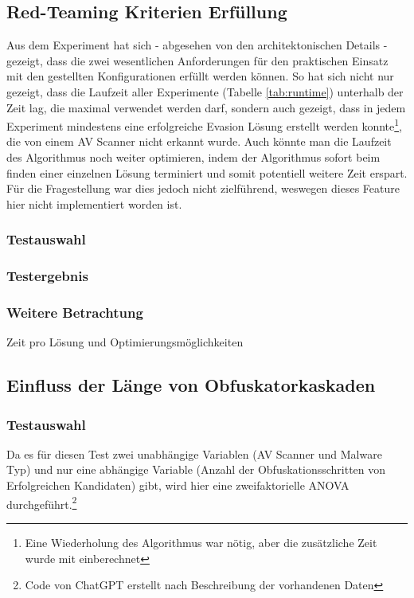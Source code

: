 \subsection{Red-Teaming Kriterien Erfüllung}
Aus dem Experiment hat sich - abgesehen von den architektonischen Details - gezeigt, dass die zwei wesentlichen Anforderungen für den praktischen Einsatz mit den gestellten Konfigurationen erfüllt werden können.
So hat sich nicht nur gezeigt, dass die Laufzeit aller Experimente (Tabelle \ref{tab:runtime}) unterhalb der Zeit lag, die maximal verwendet werden darf, sondern auch gezeigt, dass in jedem Experiment mindestens eine erfolgreiche Evasion Lösung erstellt werden konnte\footnote{Eine Wiederholung des Algorithmus war nötig, aber die zusätzliche Zeit wurde mit einberechnet}, die von einem AV Scanner nicht erkannt wurde. Auch könnte man die Laufzeit des Algorithmus noch weiter optimieren, indem der Algorithmus sofort beim finden einer einzelnen Lösung terminiert und somit potentiell weitere Zeit erspart. Für die Fragestellung war dies jedoch nicht zielführend, weswegen dieses Feature hier nicht implementiert worden ist.

\subsubsection{Testauswahl}
\subsubsection{Testergebnis}
\subsubsection{Weitere Betrachtung}
Zeit pro Lösung und Optimierungsmöglichkeiten


\subsection{Einfluss der Länge von Obfuskatorkaskaden}

 \subsubsection{Testauswahl}
 Da es für diesen Test zwei unabhängige Variablen (AV Scanner und Malware Typ) und nur eine abhängige Variable (Anzahl der Obfuskationsschritten von Erfolgreichen Kandidaten) gibt, wird hier eine zweifaktorielle ANOVA durchgeführt.\footnote{Code von ChatGPT erstellt nach Beschreibung der vorhandenen Daten}

